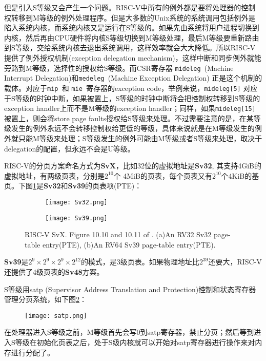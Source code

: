 \begin{enumerate}
	但是引入S等级又会产生一个问题。RISC-V中所有的例外都是要将处理器的控制权转移到M等级的例外处理程序。但是大多数的Unix系统的系统调用包括例外是陷入系统内核，而系统内核又是运行在S等级的。如果先由系统将用户进程切换到内核，然后再由CPU硬件将内核S等级切换到M等级处理，最后M等级要重新路由到S等级，交给系统内核去退出系统调用\citep{Patterson:2017:RRO:3202479}，这样效率就会大大降低。所以RISC-V提供了例外授权机制(exception delegation mechanism)，这样中断和同步例外就能旁路到M等级，选择性的授权给S等级。而CSR寄存器 {\tt mideleg }(Machine Interrupt Delegation)和{\tt medeleg }(Machine Exception  Delegation) 正是这个机制的载体。对应于{\tt mip }和 {\tt mie }寄存器的exception code，举例来说，{\tt mideleg[5]} 对应于S等级的时钟中断，如果被置上，S等级的时钟中断将会把控制权转移到S等级的exception handler上而不是M等级的exception handler；同样，如果{\tt mideleg[15]}被置上，则会将store page faults授权给S等级来处理\citep{Patterson:2017:RRO:3202479}。不过需要注意的是，在某等级发生的例外永远不会转移控制权给更低的等级，具体来说就是在M等级发生的例外就只能M等级来处理；S等级发生的例外可能由M等级或者S等级来处理，取决于delegation的配置，但永远不会是U等级\cite{Patterson:2017:RRO:3202479}。
	
	RISC-V的分页方案命名方式为\textbf{SvX}，比如32位的虚拟地址是\textbf{Sv32}, 其支持4GiB的虚拟地址，有两级页表，分别是$ 2^{10} $个 4MiB的页表，每个页表又有$ 2^{10} $个4KiB的基页。下图\ref{fig:SvX}是\textbf{Sv32}和\textbf{Sv39}的页表项(PTE)：
	\begin{figure}[!htbp]
		\centering
		\begin{subfigure}[b]{0.7\textwidth}
			\texttt{[image: Sv32.png]}
			\caption{}
		\end{subfigure}%
		
		\begin{subfigure}[b]{\textwidth}
			\texttt{[image: Sv39.png]}
			\caption{}
		\end{subfigure}%
		{RISC-V SvX. Figure 10.10 and 10.11 of \citep{Patterson:2017:RRO:3202479}. (a)An RV32 Sv32 page-table entry(PTE), (b)An RV64 Sv39 page-table entry(PTE).}
		\label{fig:SvX}
	\end{figure}
	\textbf{Sv39}是$ 2^9\times 2^9\times 2^9 \times 2^{12} $的模式，是3级页表。如果物理地址比$ 2^{39} $还要大，RISC-V还提供了4级页表的\textbf{Sv48}方案。
	
	S等级用satp (Supervisor Address Translation and Protection)控制和状态寄存器管理分页系统，如下图\ref{fig:satp}：
	\begin{figure}[!htbp]
		\centering
		\texttt{[image: satp.png]}
		\label{fig:satp}
	\end{figure}
	在处理器进入S等级之前，M等级首先会写0到satp寄存器，禁止分页；然后等到进入S等级在初始化页表之后，处于S级内核就可以开始对satp寄存器进行操作来对内存进行分配了。
\end{enumerate}

